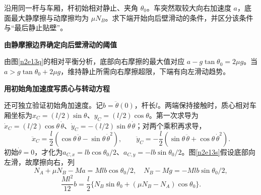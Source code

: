 \begin{question}\begin{example}[杆开始向后壁转动的条件]\label{n2e13}
沿用同一杆与车厢，杆初始相对静止、夹角 $\theta_0$。车突然取较大向右加速度 $a$，底面最大静摩擦与动摩擦均为 $\mu N_B$。求下端开始向后壁滑动的条件，并区分该条件与“最后静止贴壁”。
\end{example}\end{question}
\begin{solution}\textbf{由静摩擦边界确定向后壁滑动的阈值}\par\nobreak
由图\ref{n2e13q}的相对平衡分析，底部向右摩擦的最大值对应 $a-g\tan\theta_0=2\mu g$。当 $a>g\tan\theta_0+2\mu g$，维持静止所需向右摩擦超限，下端有向左滑动趋势。



\par\medskip{}\noindent\textbf{用初始角加速度写质心与转动方程}\par\nobreak
还可独立验证初始角加速度。记$b=\ddot\theta(0)$，杆长$l$。两端保持接触时，质心相对车厢坐标为$x_C=(l/2)\sin\theta$、$y_C=(l/2)\cos\theta$。第一次求导为$\dot x_C=(l/2)\cos\theta\,\dot\theta$、$\dot y_C=-(l/2)\sin\theta\,\dot\theta$；对两个乘积再求导，
\[
\ddot x_C=\frac l2(\cos\theta\,\ddot\theta-\sin\theta\,\dot\theta^2),\qquad
\ddot y_C=-\frac l2(\sin\theta\,\ddot\theta+\cos\theta\,\dot\theta^2).
\]
初始$\dot\theta=0$，才化为$a_{C,x}=lb\cos\theta_0/2$、$a_{C,y}=-lb\sin\theta_0/2$。图\ref{n2e13s}假设底部向左滑，故摩擦向右，列
\[
 N_A+\mu N_B-Ma=Mlb\cos\theta_0/2,\quad
 N_B-Mg=-Mlb\sin\theta_0/2,
\]
\[
 \frac{Ml^2}{12}b=\frac l2\{N_B\sin\theta_0+(\mu N_B-N_A)\cos\theta_0\}.
\]



\end{solution}
